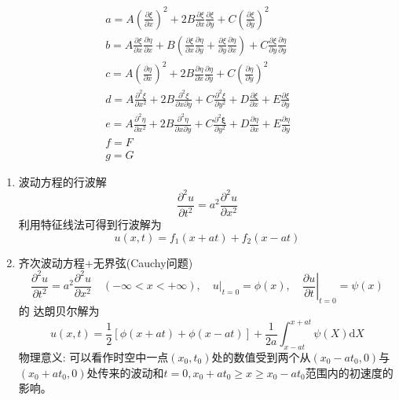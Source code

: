 \documentclass[UTF8,8pt]{ctexart}
\renewcommand{\r}[1]{{\color{red} #1}}
\begin{document}
\begin{multicols}{2}
$$    \begin{array}{l}{a=A\left(\frac{\partial \xi}{\partial x}\right)^{2}+2 B \frac{\partial \xi}{\partial x} \frac{\partial \xi}{\partial y}+C\left(\frac{\partial \xi}{\partial y}\right)^{2}} \\ {b=A \frac{\partial \xi}{\partial x} \frac{\partial \eta}{\partial x}+B\left(\frac{\partial \xi}{\partial x} \frac{\partial \eta}{\partial y}+\frac{\partial \xi}{\partial y} \frac{\partial \eta}{\partial x}\right)+C \frac{\partial \xi}{\partial y} \frac{\partial \eta}{\partial y}} \\ {c=A\left(\frac{\partial \eta}{\partial x}\right)^{2}+2 B \frac{\partial \eta}{\partial x} \frac{\partial \eta}{\partial y}+C\left(\frac{\partial \eta}{\partial y}\right)^{2}} \\ {d=A \frac{\partial^{2} \xi}{\partial x^{2}}+2 B \frac{\partial^{2} \xi}{\partial x \partial y}+C \frac{\partial^{2} \xi}{\partial y^{2}}+D \frac{\partial \xi}{\partial x}+E \frac{\partial \xi}{\partial y}} \\ {e=A \frac{\partial^{2} \eta}{\partial x^{2}}+2 B \frac{\partial^{2} \eta}{\partial x \partial y}+C \frac{\partial^{2} \boldsymbol{\xi}}{\partial y^{2}}+D \frac{\partial \eta}{\partial x}+E \frac{\partial \eta}{\partial y}} \\ {f=F} \\ {g=G}\end{array}
    $$
    \begin{enumerate}
    \item 波动方程的行波解
    $$ 
    \frac{\partial^{2} u}{\partial t^{2}}=a^{2} \frac{\partial^{2} u}{\partial x^{2}}
    $$利用特征线法可得到行波解为
    $$u(x,t)=f_{1}(x+a t)+f_{2}(x-a t)$$
    \item 齐次波动方程+无界弦(Cauchy问题)
    $$ 
    \frac{\partial^{2} u}{\partial t^{2}}=a^{2} \frac{\partial^{2} u}{\partial x^{2}} \quad(-\infty<x<+\infty), \quad\left.u\right|_{t=0}=\phi(x), \quad\left.\frac{\partial u}{\partial t}\right|_{t=0}=\psi(x)
    $$
    的\r{达朗贝尔解}为$$ u(x,t)=
    \frac{1}{2}[\phi(x+a t)+\phi(x-a t)]+\frac{1}{2 a} \int_{x-a t}^{x+a t} \psi(X) \mathrm{d} X
    $$
    物理意义: 可以看作时空中一点$ (x_0, t_0) $处的数值受到两个从$ (x_0−at_0, 0) $与$ (x_0+at_0, 0) $处传来的波动和$t = 0, x_0+at_0 ≥ x ≥ x_0−at_0$范围内的初速度的影响。
    

\end{enumerate}
\end{multicols}
\end{document}
